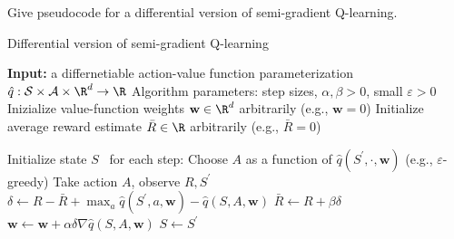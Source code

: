 
\begin{exercise}

Give pseudocode for a differential version of semi-gradient Q-learning.

\end{exercise}


\begin{solution}
\phantom{}
\begin{algorithm}[H]
\caption{Differential version of semi-gradient Q-learning}
\begin{algorithmic}[1]
  \State \textbf{Input:} a differnetiable action-value function parameterization $\hat{q}: \mathcal{S} \times \mathcal{A} \times \R^d \rightarrow \R$
  \State Algorithm parameters: step sizes, $\alpha, \beta > 0$, small $\varepsilon > 0$
  \State Inizialize value-function weights $\textbf{w} \in \R^d$ arbitrarily (e.g., $\textbf{w} = 0$)
  \State Initialize average reward estimate $\bar{R} \in \R$ arbitrarily (e.g., $\bar{R} = 0$)

  \State Initialize state $S$
  \Loop \ for each step:
  \State Choose $A$ as a function of $\hat{q}(S^\prime,\cdot,\textbf{w})$ (e.g., $\varepsilon$-greedy)
  \State Take action $A$, observe $R, S^\prime$
  \State $\delta \leftarrow R - \bar{R} + \max_a \hat{q}(S^\prime,a,\textbf{w}) - \hat{q}(S,A,\textbf{w})$
  \State $\bar{R} \leftarrow R + \beta \delta$
  \State $\textbf{w} \leftarrow \textbf{w} + \alpha \delta \nabla \hat{q}(S,A,\textbf{w})$
  \State $S \leftarrow S^\prime$
  \EndLoop
\end{algorithmic}
\end{algorithm}
\end{solution}

